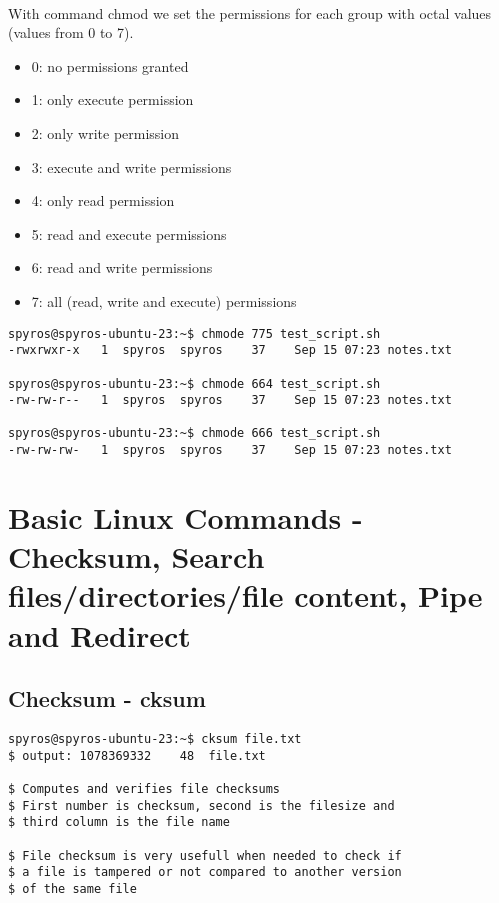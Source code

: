 \documentclass{article}
\begin{document}
\paragraph{} With command chmod we set the permissions for each group with octal values (values from 0 to 7).
\begin{itemize}
	\item 0: no permissions granted
	\item 1: only execute permission
	\item 2: only write permission
	\item 3: execute and write permissions
	\item 4: only read permission
	\item 5: read and execute permissions
	\item 6: read and write permissions
	\item 7: all (read, write and execute) permissions
\end{itemize}
\begin{lstlisting}
spyros@spyros-ubuntu-23:~$ chmode 775 test_script.sh
-rwxrwxr-x	 1	spyros	spyros	  37	Sep 15 07:23 notes.txt

spyros@spyros-ubuntu-23:~$ chmode 664 test_script.sh
-rw-rw-r--	 1	spyros	spyros	  37	Sep 15 07:23 notes.txt

spyros@spyros-ubuntu-23:~$ chmode 666 test_script.sh
-rw-rw-rw-	 1	spyros	spyros	  37	Sep 15 07:23 notes.txt

\end{lstlisting}


\section{Basic Linux Commands - Checksum, Search files/directories/file content, Pipe and Redirect}

\subsection{Checksum - cksum}
\begin{lstlisting}
spyros@spyros-ubuntu-23:~$ cksum file.txt
$ output: 1078369332	48	file.txt

$ Computes and verifies file checksums
$ First number is checksum, second is the filesize and
$ third column is the file name

$ File checksum is very usefull when needed to check if
$ a file is tampered or not compared to another version
$ of the same file

\end{lstlisting}
\end{document}
